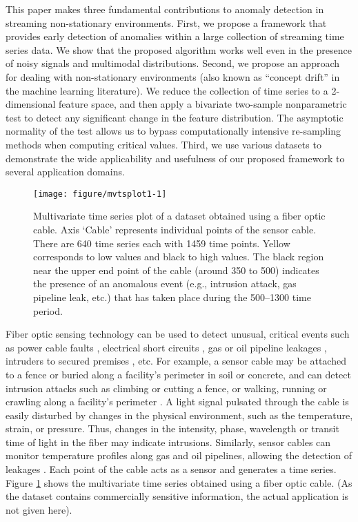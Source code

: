 \documentclass[12pt]{article}
\begin{document}
This paper makes three fundamental contributions to anomaly detection in
streaming non-stationary environments. First, we propose a framework
that provides early detection of anomalies within a large collection of
streaming time series data. We show that the proposed algorithm works
well even in the presence of noisy signals and multimodal distributions.
Second, we propose an approach for dealing with non-stationary
environments (also known as ``concept drift'' in the machine learning
literature). We reduce the collection of time series to a 2-dimensional
feature space, and then apply a bivariate two-sample nonparametric test
to detect any significant change in the feature distribution. The
asymptotic normality of the test allows us to bypass computationally
intensive re-sampling methods when computing critical values. Third, we
use various datasets to demonstrate the wide applicability and
usefulness of our proposed framework to several application domains.

\begin{figure}[ht]

{\centering \texttt{[image: figure/mvtsplot1-1]} 

}

\caption{Multivariate time series plot of a dataset obtained using a fiber optic cable. Axis `Cable' represents individual points of the sensor cable. There are 640 time series each with 1459 time points. Yellow corresponds to low values and black to high values. The black region near the upper end point of the cable (around 350 to 500) indicates the presence of an anomalous event (e.g., intrusion attack, gas pipeline leak, etc.) that has taken place during the 500--1300 time period.}\label{fig:mvtsplot1}
\end{figure}

Fiber optic sensing technology can be used to detect unusual, critical
events such as power cable faults \citep{jiang2009technological},
electrical short circuits \citep{krohn2000fiber}, gas or oil pipeline
leakages \citep{yoon2011swats, nikles2009long}, intruders to secured
premises \citep{nikles2009long}, etc. For example, a sensor cable may be
attached to a fence or buried along a facility's perimeter in soil or
concrete, and can detect intrusion attacks such as climbing or cutting a
fence, or walking, running or crawling along a facility's perimeter
\citep{catalano2014intrusion}. A light signal pulsated through the cable
is easily disturbed by changes in the physical environment, such as the
temperature, strain, or pressure. Thus, changes in the intensity, phase,
wavelength or transit time of light in the fiber may indicate
intrusions. Similarly, sensor cables can monitor temperature profiles
along gas and oil pipelines, allowing the detection of leakages
\citep{krohn2000fiber}. Each point of the cable acts as a sensor and
generates a time series. Figure \ref{fig:mvtsplot1} shows the
multivariate time series obtained using a fiber optic cable. (As the
dataset contains commercially sensitive information, the actual
application is not given here).
\end{document}
